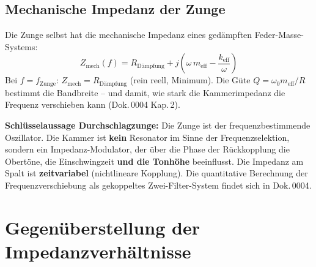 \documentclass[11pt,a4paper]{article}
\begin{document}
\subsection{Mechanische Impedanz der Zunge}

Die Zunge selbst hat die mechanische Impedanz eines gedämpften Feder-Masse-Systems:
\begin{equation}
Z_\text{mech}(f) = R_\text{Dämpfung} + j\!\left(\omega\, m_\text{eff} - \frac{k_\text{eff}}{\omega}\right)
\end{equation}
Bei $f = f_\text{Zunge}$: $Z_\text{mech} = R_\text{Dämpfung}$ (rein reell, Minimum). Die Güte $Q = \omega_0 m_\text{eff}/R$ bestimmt die Bandbreite -- und damit, wie stark die Kammerimpedanz die Frequenz verschieben kann (Dok.\,0004 Kap.\,2).

\begin{keybox}
\textbf{Schlüsselaussage Durchschlagzunge:} Die Zunge ist der frequenzbestimmende Oszillator. Die Kammer ist \textbf{kein} Resonator im Sinne der Frequenzselektion, sondern ein Impedanz-Modulator, der über die Phase der Rückkopplung die Obertöne, die Einschwingzeit \textbf{und die Tonhöhe} beeinflusst. Die Impedanz am Spalt ist \textbf{zeitvariabel} (nichtlineare Kopplung). Die quantitative Berechnung der Frequenzverschiebung als gekoppeltes Zwei-Filter-System findet sich in Dok.\,0004.
\end{keybox}

\section{Gegenüberstellung der Impedanzverhältnisse}
\end{document}
